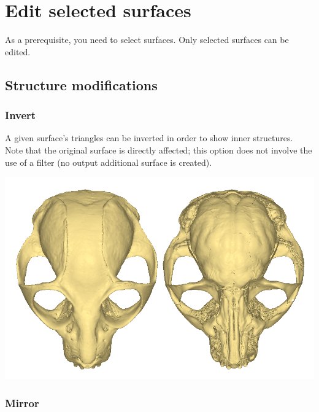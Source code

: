 
\chapter{Edit selected surfaces}
\minitoc 
As a prerequisite, you need to select surfaces. Only selected surfaces can be edited. 
\section{Structure modifications}
\subsection{Invert}
\noindent
\begin{minipage}{0.3\textwidth}

A given surface's triangles can be
inverted in order to show inner structures.\\

Note that the original surface
is directly affected; this option
does not involve the use of a
filter (no output additional
surface is created).
\end{minipage}  
 \begin{minipage}{0.6\textwidth}\centering
  \includegraphics[scale=0.35]{images/Edit_selected_objects/01_invert.png}
 \end{minipage} 
\noindent




\subsection{Mirror}

